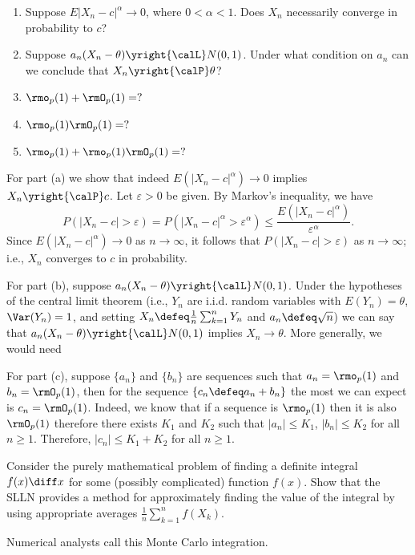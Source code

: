 \begin{problem}[DasGupta 7.2 (a), (b), (c), (d), (e)]
  \begin{enumerate}[label=(\alph*),noitemsep]
  \item Suppose \(E|X_n-c|^\alpha\to 0\), where \(0<\alpha<1\). Does
    \(X_n\) necessarily converge in probability to \(c\)?
  \item Suppose \(a_n(X_n-\theta)\yright{\calL}N(0,1)\). Under what
    condition on \(a_n\) can we conclude that \(X_n\yright{\calP}\theta\)?
  \item \(\rmo_p(1)+\rmO_p(1)=?\)
  \item \(\rmo_p(1)\rmO_p(1)=?\)
  \item \(\rmo_p(1)+\rmo_p(1)\rmO_p(1)=?\)
  \end{enumerate}
\end{problem}
\begin{solution}
  For part (a) we show that indeed \(E(|X_n-c|^\alpha)\to 0\) implies
  \(X_n\yright{\calP}c\). Let \(\varepsilon>0\) be given. By Markov's
  inequality, we have
  \[
    P(|X_n-c|>\varepsilon)=
    P(|X_n-c|^\alpha>\varepsilon^\alpha)
    \leq\frac{E(|X_n-c|^\alpha)}{\varepsilon^\alpha}.
  \]
  Since \(E(|X_n-c|^\alpha)\to 0\) as \(n\to\infty\), it follows that
  \(P(|X_n-c|>\varepsilon)\) as \(n\to\infty\); i.e., \(X_n\) converges to
  \(c\) in probability.

  For part (b), suppose \(a_n(X_n-\theta)\yright{\calL}N(0,1)\). Under the
  hypotheses of the central limit theorem (i.e., \(Y_n\) are i.i.d.\@
  random variables with \(E(Y_n)=\theta\), \(\Var(Y_n)=1\), and setting
  \(X_n\defeq\frac{1}{n}\sum_{k=1}^n Y_n\) and \(a_n\defeq\sqrt{n}\)) we
  can say that \(a_n(X_n-\theta)\yright{\calL}N(0,1)\) implies
  \(X_n\to\theta\). More generally, we would need

  For part (c), suppose \(\{a_n\}\) and \(\{b_n\}\) are sequences such that
  \(a_n=\rmo_p(1)\) and \(b_n=\rmO_p(1)\), then for the sequence
  \(\{c_n\defeq a_n+b_n\}\) the most we can expect is
  \(c_n=\rmO_p(1)\). Indeed, we know that if a sequence is \(\rmo_p(1)\)
  then it is also \(\rmO_p(1)\) therefore there exists \(K_1\) and \(K_2\)
  such that \(|a_n|\leq K_1\), \(|b_n|\leq K_2\) for all \(n\geq
  1\). Therefore, \(|c_n|\leq K_1+K_2\) for all \(n\geq 1\).
\end{solution}
\newpage

\begin{problem}
  Consider the purely mathematical problem of finding a definite integral
  \(f(x)\diff x\) for some (possibly complicated) function \(f(x)\). Show
  that the SLLN provides a method for approximately finding the value of
  the integral by using appropriate averages
  \(\frac{1}{n}\sum_{k=1}^n f(X_k)\).

  Numerical analysts call this Monte Carlo integration.
\end{problem}
\begin{solution}

\end{solution}
\newpage

